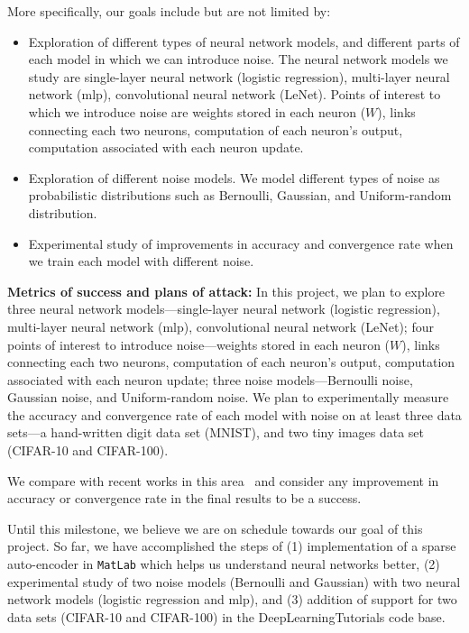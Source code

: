 More specifically, our goals include but are not limited by:
\begin{itemize}
  \item Exploration of different types of neural network models, and different
    parts of each model in which we can introduce noise. The neural network
    models we study are single-layer neural network (logistic regression),
    multi-layer neural network (mlp), convolutional neural network (LeNet).
    Points of interest to which we introduce noise are weights stored in each
    neuron ($W$), links connecting each two neurons, computation of each
    neuron's output, computation associated with each neuron update.
  \item Exploration of different noise models. We model different types of noise
    as probabilistic distributions such as Bernoulli, Gaussian, and
    Uniform-random distribution.
  \item Experimental study of improvements in accuracy and convergence rate when
    we train each model with different noise.
\end{itemize}

{\bf Metrics of success and plans of attack:}
In this project, we plan to explore three neural network models---single-layer
neural network (logistic regression), multi-layer neural network (mlp),
convolutional neural network (LeNet); four points of interest to introduce
noise---weights stored in each neuron ($W$), links connecting each two neurons,
computation of each neuron's output, computation associated with each neuron
update; three noise models---Bernoulli noise, Gaussian noise, and Uniform-random
noise. We plan to experimentally measure the accuracy and convergence rate of
each model with noise on at least three data sets---a hand-written digit data
set (MNIST), and two tiny images data set (CIFAR-10 and CIFAR-100).

We compare with recent works in this area~\cite{srivastava2013improving,
hinton2012improving, wan2013dropconnect, goodfellow13maxout} and consider any
improvement in accuracy or convergence rate in the final results to be a
success.

Until this milestone, we believe we are on schedule towards our goal of this
project. So far, we have accomplished the steps of (1) implementation of a
sparse auto-encoder in {\tt MatLab} which helps us understand neural networks
better, (2) experimental study of two noise models (Bernoulli and Gaussian) with
two neural network models (logistic regression and mlp), and (3) addition of
support for two data sets (CIFAR-10 and CIFAR-100) in the DeepLearningTutorials
code base.

